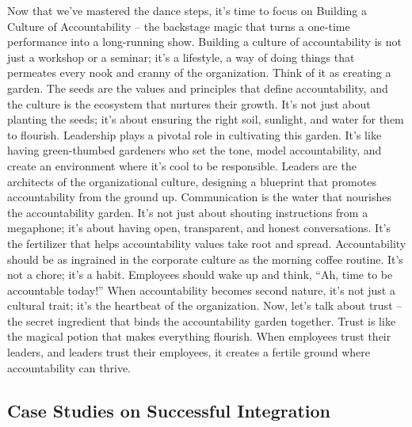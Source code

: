 \documentclass[
  letterpaper,
  DIV=11,
  numbers=noendperiod]{scrreprt}
\begin{document}
Now that we've mastered the dance steps, it's time to focus on Building
a Culture of Accountability -- the backstage magic that turns a one-time
performance into a long-running show. Building a culture of
accountability is not just a workshop or a seminar; it's a lifestyle, a
way of doing things that permeates every nook and cranny of the
organization. Think of it as creating a garden. The seeds are the values
and principles that define accountability, and the culture is the
ecosystem that nurtures their growth. It's not just about planting the
seeds; it's about ensuring the right soil, sunlight, and water for them
to flourish. Leadership plays a pivotal role in cultivating this garden.
It's like having green-thumbed gardeners who set the tone, model
accountability, and create an environment where it's cool to be
responsible. Leaders are the architects of the organizational culture,
designing a blueprint that promotes accountability from the ground up.
Communication is the water that nourishes the accountability garden.
It's not just about shouting instructions from a megaphone; it's about
having open, transparent, and honest conversations. It's the fertilizer
that helps accountability values take root and spread. Accountability
should be as ingrained in the corporate culture as the morning coffee
routine. It's not a chore; it's a habit. Employees should wake up and
think, ``Ah, time to be accountable today!'' When accountability becomes
second nature, it's not just a cultural trait; it's the heartbeat of the
organization. Now, let's talk about trust -- the secret ingredient that
binds the accountability garden together. Trust is like the magical
potion that makes everything flourish. When employees trust their
leaders, and leaders trust their employees, it creates a fertile ground
where accountability can thrive.

\subsection{Case Studies on Successful
Integration}\label{case-studies-on-successful-integration}
\end{document}
